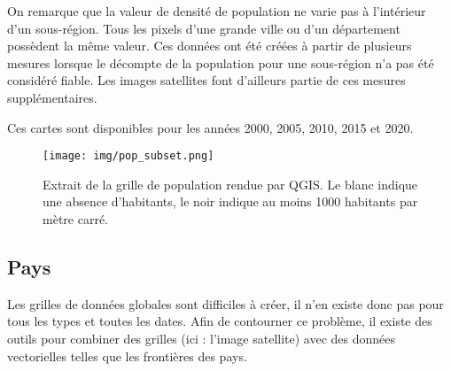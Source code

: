 \documentclass[a4paper]{report}
\begin{document}
On remarque que la valeur de densité de population ne varie pas à l'intérieur d'un sous-région. Tous les pixels d'une grande ville ou d'un département possèdent la même valeur. Ces données ont été créées à partir de plusieurs mesures lorsque le décompte de la population pour une sous-région n'a pas été considéré fiable. Les images satellites font d'ailleurs partie de ces mesures supplémentaires.

Ces cartes sont disponibles pour les années 2000, 2005, 2010, 2015 et 2020.

\begin{figure}[h]
	\centering
	\texttt{[image: img/pop\_subset.png]}
	\caption{Extrait de la grille de population \cite{sedac} rendue par QGIS. Le blanc indique une absence d'habitants, le noir indique au moins 1000 habitants par mètre carré.}
	\label{qgis-sedac}
\end{figure}


\subsection{Pays}
Les grilles de données globales sont difficiles à créer, il n'en existe donc pas pour tous les types et toutes les dates. Afin de contourner ce problème, il existe des outils pour combiner des grilles (ici : l'image satellite) avec des données vectorielles telles que les frontières des pays.
\end{document}

